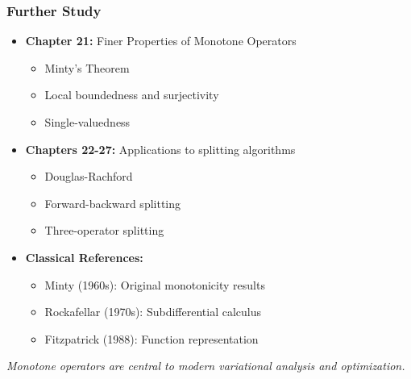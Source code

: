 \documentclass[aspectratio=169,10pt]{beamer}
\begin{document}
\begin{frame}
    \frametitle{Further Study}

    \begin{itemize}
        \item \textbf{Chapter 21:} Finer Properties of Monotone Operators
            \begin{itemize}
                \item Minty's Theorem
                \item Local boundedness and surjectivity
                \item Single-valuedness
            \end{itemize}

        \item \textbf{Chapters 22-27:} Applications to splitting algorithms
            \begin{itemize}
                \item Douglas-Rachford
                \item Forward-backward splitting
                \item Three-operator splitting
            \end{itemize}

        \item \textbf{Classical References:}
            \begin{itemize}
                \item Minty (1960s): Original monotonicity results
                \item Rockafellar (1970s): Subdifferential calculus
                \item Fitzpatrick (1988): Function representation
            \end{itemize}
    \end{itemize}

    \vspace{2em}

    \centering
    \textit{Monotone operators are central to modern variational analysis and optimization.}
\end{frame}
\end{document}
